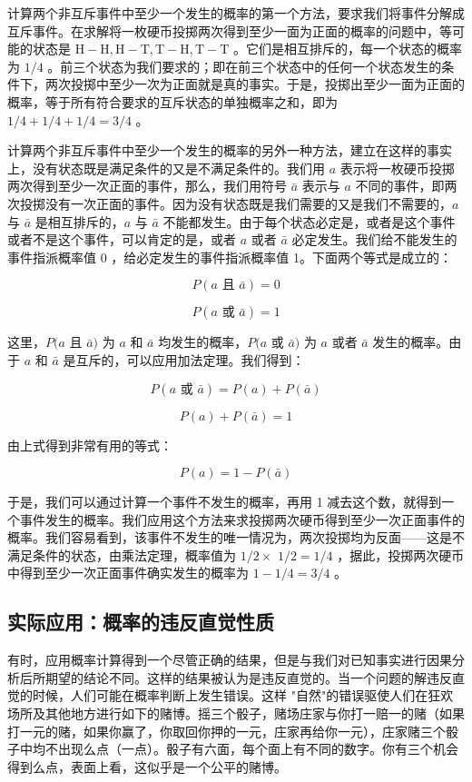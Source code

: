 计算两个非互斥事件中至少一个发生的概率的第一个方法，要求我们将事件分解成互斥事件。在求解将一枚硬币投掷两次得到至少一面为正面的概率的问题中，等可能的状态是 $\mathrm{H}-\mathrm{H}, \mathrm{H}-\mathrm{T}, \mathrm{T}-\mathrm{H}, \mathrm{T}-\mathrm{T}$ 。它们是相互排斥的，每一个状态的概率为 $1 / 4$ 。前三个状态为我们要求的；即在前三个状态中的任何一个状态发生的条件下，两次投掷中至少一次为正面就是真的事实。于是，投掷出至少一面为正面的概率，等于所有符合要求的互斥状态的单独概率之和，即为 $1 / 4+1 / 4+1 / 4=3 / 4$ 。

计算两个非互斥事件中至少一个发生的概率的另外一种方法，建立在这样的事实上，没有状态既是满足条件的又是不满足条件的。我们用 $a$ 表示将一枚硬币投掷两次得到至少一次正面的事件，那么，我们用符号 $\bar{a}$ 表示与 $a$ 不同的事件，即两次投掷没有一次正面的事件。因为没有状态既是我们需要的又是我们不需要的，$a$ 与 $\bar{a}$ 是相互排斥的，$a$ 与 $\bar{a}$ 不能都发生。由于每个状态必定是，或者是这个事件或者不是这个事件，可以肯定的是，或者 $a$ 或者 $\bar{a}$ 必定发生。我们给不能发生的事件指派概率值 0 ，给必定发生的事件指派概率值 1。下面两个等式是成立的：

$$
P(a \text { 且 } \bar{a})=0
$$

$$
P(a \text { 或 } \bar{a})=1
$$

这里，$P(a$ 且 $\bar{a})$ 为 $a$ 和 $\bar{a}$ 均发生的概率，$P(a$ 或 $\bar{a})$ 为 $a$ 或者 $\bar{a}$ 发生的概率。由于 $a$ 和 $\bar{a}$ 是互斥的，可以应用加法定理。我们得到：

$$
P(a \text { 或 } \bar{a})=P(a)+P(\bar{a})
$$

$$
P(a)+P(\bar{a})=1
$$

由上式得到非常有用的等式：

$$
P(a)=1-P(\bar{a})
$$

于是，我们可以通过计算一个事件不发生的概率，再用 1 减去这个数，就得到一个事件发生的概率。我们应用这个方法来求投掷两次硬币得到至少一次正面事件的概率。我们容易看到，该事件不发生的唯一情况为，两次投掷均为反面——这是不满足条件的状态，由乘法定理，概率值为 $1 / 2 \times$ $1 / 2=1 / 4$ ，据此，投掷两次硬币中得到至少一次正面事件确实发生的概率为 $1-1 / 4=3 / 4$ 。

\subsection{实际应用：概率的违反直觉性质}

有时，应用概率计算得到一个尽管正确的结果，但是与我们对已知事实进行因果分析后所期望的结论不同。这样的结果被认为是违反直觉的。当一个问题的解违反直觉的时候，人们可能在概率判断上发生错误。这样 "自然"的错误驱使人们在狂欢场所及其他地方进行如下的赌博。摇三个骰子，赌场庄家与你打一赔一的赌（如果打一元的赌，如果你赢了，你取回你押的一元，庄家再给你一元），庄家赌三个骰子中均不出现么点（一点）。骰子有六面，每个面上有不同的数字。你有三个机会得到么点，表面上看，这似乎是一个公平的赌博。

